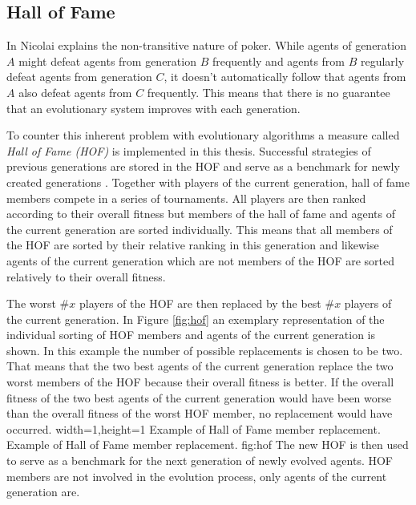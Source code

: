 \subsection{Hall of Fame}
\label{subsec:hof}
In \cite[p. 63]{evolutionary_methods} Nicolai explains the non-transitive nature of poker. While agents of generation $A$ might defeat agents from generation $B$ frequently and agents from $B$ regularly defeat agents from generation $C$, it doesn't automatically follow that agents from $A$ also defeat agents from $C$ frequently. This means that there is no guarantee that an evolutionary system improves with each generation. \par
To counter this inherent problem with evolutionary algorithms a measure called \textit{Hall of Fame (HOF)} is implemented in this thesis. Successful strategies of previous generations are stored in the HOF and serve as a benchmark for newly created generations \cite{evolutionary_methods}. Together with players of the current generation, hall of fame members compete in a series of tournaments. All players are then ranked according to their overall fitness but members of the hall of fame and agents of the current generation are sorted individually. This means that all members of the HOF are sorted by their relative ranking in this generation and likewise agents of the current generation which are not members of the HOF are sorted relatively to their overall fitness. \par
The worst $\#x$ players of the HOF are then replaced by the best $\#x$ players of the current generation.
In Figure \ref{fig:hof} an exemplary representation of the individual sorting of HOF members and agents of the current generation is shown. In this example the number of possible replacements is chosen to be two. That means that the two best agents of the current generation replace the two worst members of the HOF because their overall fitness is better. If the overall fitness of the two best agents of the current generation would have been worse than the overall fitness of the worst HOF member, no replacement would have occurred.
  {width=1\textwidth,height=1\textheight}%
  {Example of Hall of Fame member replacement.}%
  {Example of Hall of Fame member replacement.}%
  {fig:hof}%
  The new HOF is then used to serve as a benchmark for the next generation of newly evolved agents.
 HOF members are not involved in the evolution process, only agents of the current generation are.
\pagebreak

